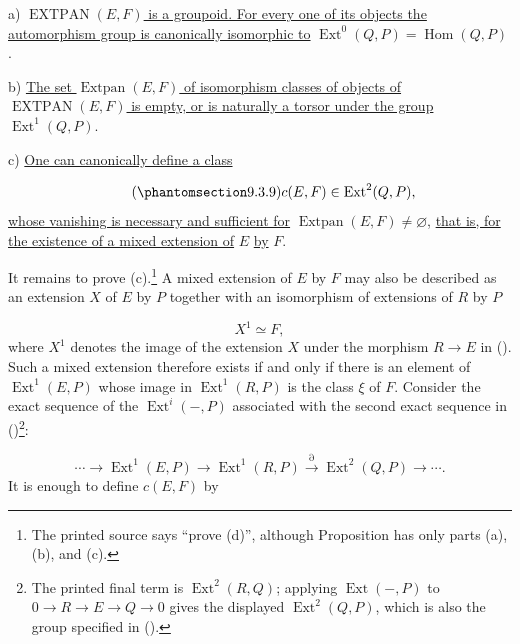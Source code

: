 \smallskip
\noindent
a) \underline{$\operatorname{EXTPAN}(E,F)$ is a groupoid. For every one
of its objects the automorphism group is canonically isomorphic to}
$\operatorname{Ext}^0(Q,P)=\operatorname{Hom}(Q,P)$.

\smallskip
\noindent
b) \underline{The set $\operatorname{Extpan}(E,F)$ of isomorphism classes
of objects of $\operatorname{EXTPAN}(E,F)$ is empty, or is naturally a
torsor under the group} $\operatorname{Ext}^1(Q,P)$.

\smallskip
\noindent
c) \underline{One can canonically define a class}

\begin{equation}\tag{\SGARefTarget{sga7.sga7i.eix.n9-3-9}{9.3.9}}
c(E,F)\in\operatorname{Ext}^2(Q,P),
\end{equation}
\underline{whose vanishing is necessary and sufficient for}
$\operatorname{Extpan}(E,F)\neq\varnothing$, \underline{that is, for the
existence of a mixed extension of} $E$ \underline{by} $F$.

It remains to prove (c).\footnote{The printed source says ``prove (d)'',
although Proposition  has only parts (a), (b), and (c).} A mixed
extension of $E$ by $F$ may also be described as an extension $X$ of $E$
by $P$ together with an isomorphism of extensions of $R$ by $P$

\begin{equation*}
X^1\simeq F,
\end{equation*}
where $X^1$ denotes the image of the extension $X$ under the morphism
$R\longrightarrow E$ in (). Such a mixed extension therefore exists
if and only if there is an element of $\operatorname{Ext}^1(E,P)$ whose
image in $\operatorname{Ext}^1(R,P)$ is the class $\xi$ of $F$. Consider
the exact sequence of the $\operatorname{Ext}^i(-,P)$ associated with the
second exact sequence in ()\footnote{The printed final term is
$\operatorname{Ext}^2(R,Q)$; applying $\operatorname{Ext}(-,P)$ to
$0\to R\to E\to Q\to0$ gives the displayed $\operatorname{Ext}^2(Q,P)$,
which is also the group specified in ().}:

\begin{equation*}
\cdots\longrightarrow
\operatorname{Ext}^1(E,P)\longrightarrow
\operatorname{Ext}^1(R,P)
\xrightarrow{\partial}
\operatorname{Ext}^2(Q,P)\longrightarrow\cdots .
\end{equation*}
It is enough to define $c(E,F)$ by

